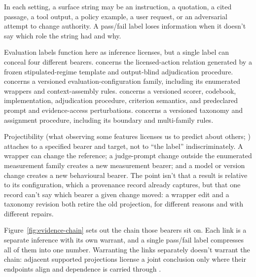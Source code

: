 In each setting, a surface string may be an instruction, a quotation, a cited passage, a tool output, a policy example, a user request, or an adversarial attempt to change authority. A pass/fail label loses information when it doesn't say which role the string had and why.

Evaluation labels function here as inference licenses, but a single label can conceal four different bearers.  concerns the licensed-action relation generated by a frozen stipulated-regime template and output-blind adjudication procedure.  concerns a versioned evaluation-configuration family, including its enumerated wrappers and context-assembly rules.  concerns a versioned scorer, codebook, implementation, adjudication procedure, criterion semantics, and predeclared prompt and evidence-access perturbations.  concerns a versioned taxonomy and assignment procedure, including its boundary and multi-family rules.

Projectibility (what observing some features licenses us to predict about others; \citealp{Goodman1955,reynolds2026kindsProjectibilityProfiles}) attaches to a specified bearer and target, not to \enquote{the label} indiscriminately. A wrapper can change the reference; a judge-prompt change outside the enumerated measurement family creates a new measurement bearer; and a model or version change creates a new behavioural bearer. The point isn't that a result is relative to its configuration, which a provenance record already captures, but that one record can't say which bearer a given change moved: a wrapper edit and a taxonomy revision both retire the old projection, for different reasons and with different repairs.

Figure~\ref{fig:evidence-chain} sets out the chain those bearers sit on. Each link is a separate inference with its own warrant, and a single pass/fail label compresses all of them into one number. Warranting the links separately doesn't warrant the chain: adjacent supported projections license a joint conclusion only where their endpoints align and dependence is carried through \citep{reynolds2026nonComposition}.

